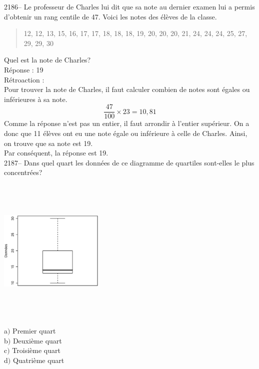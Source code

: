 \documentclass[letterpaper, 12pt]{article}
\begin{document}

2186-- Le professeur de Charles lui dit que sa note au dernier examen lui a permis d'obtenir un rang centile de 47.  Voici les notes des \'el\`eves de la classe.
\begin{quote}
12, 12, 13, 15, 16, 17, 17, 18, 18, 18, 19, 20, 20, 20, 21, 24, 24, 24, 25, 27, 29, 29, 30
\end{quote}
Quel est la note de Charles? \\

R\'eponse : 19\\

R\'etroaction :\\
Pour trouver la note de Charles, il faut calculer combien de notes sont \'egales ou inf\'erieures \`a sa note.
\begin{equation*}
 \frac{47}{100}\times 23 = 10,81
\end{equation*}
Comme la r\'eponse n'est pas un entier, il faut arrondir \`a l'entier sup\'erieur. On a donc que 11 \'el\`eves ont eu une note \'egale ou inf\'erieure \`a celle de Charles. Ainsi, on trouve que sa note est 19.\\
Par cons\'equent, la r\'eponse est 19.\\

2187-- Dans quel quart les donn\'ees de ce diagramme de quartiles sont-elles le plus concentr\'ees?
\begin{center}
 \includegraphics[width=5cm,height=7cm,angle=-90]{Q2035.eps}
\end{center}

a$)$ Premier quart\\
b$)$ Deuxi\`eme quart\\
c$)$ Troisi\`eme quart\\
d$)$ Quatri\`eme quart\\
\end{document}
